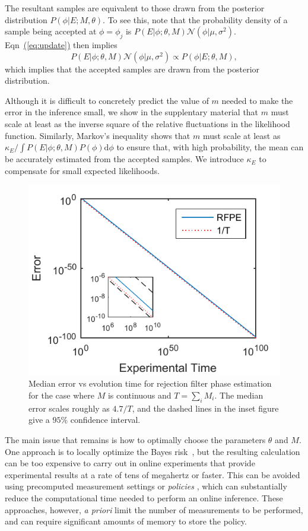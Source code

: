 \documentclass[aps,pra,amsmath,twocolumn,amssymb,superscriptaddress]{revtex4-1}
\newcommand{\eq}[1]{\hyperref[eq:#1]{(\ref*{eq:#1})}}
\newcommand{\app}[1]{the supplentary material}
\begin{document}
The resultant samples are equivalent to those drawn from the posterior distribution
$P(\phi|E;M,\theta)$.  To see this, note that the probability density of a sample being accepted at $\phi=\phi_j$ is $ P(E | \phi; \theta, M) \mathcal{N}(\phi|\mu,\sigma^2)$.  Eqn~\eq{update} then implies 
\begin{equation}
    P(E | \phi; \theta, M) \mathcal{N}(\phi|\mu,\sigma^2) \propto P(\phi | E; \theta, M),
\end{equation}
which implies that the accepted samples are drawn from the posterior distribution.  

Although it is difficult to concretely predict the value of $m$ needed to make the error in the inference small, we show in \app{stability} that $m$ must scale at least as the inverse square of the relative fluctuations in the likelihood function.  Similarly, Markov's inequality shows that $m$ must scale at least as $\kappa_E/\int P(E|\phi;\theta,M)P(\phi) \mathrm{d}\phi$ to ensure that, with high probability, the mean can be accurately estimated from the accepted samples.  We introduce $\kappa_E$ to compensate for small expected likelihoods.

\begin{figure}[t!]
\includegraphics[width=0.9\linewidth]{Longpet2.pdf}
\caption{Median error vs evolution time for rejection filter phase estimation for the case where $M$ is continuous and $T=\sum_i M_i$.  The median error scales roughly as $4.7/T$, and the dashed lines in the inset figure give a $95\%$ confidence interval.}\label{fig:rms}
\end{figure}

The main issue that remains is how to optimally choose the parameters $\theta$
and $M$. One approach is to locally optimize the Bayes
risk~\cite{granade_robust_2012}, but the resulting calculation can be too
expensive to carry out in online experiments that provide experimental results
at a rate of tens of megahertz or faster.
This can be avoided using precomputed
measurement settings
\cite{sergeevich_characterization_2011}
or \emph{policies} \cite{hentschel_machine_2010,hayes_swarm_2014}, which
can substantially reduce the computational time needed to perform an online inference. These approaches,
however, \emph{a priori} limit the number of measurements to
be performed, and can require significant amounts of memory to store the policy.
\end{document}
